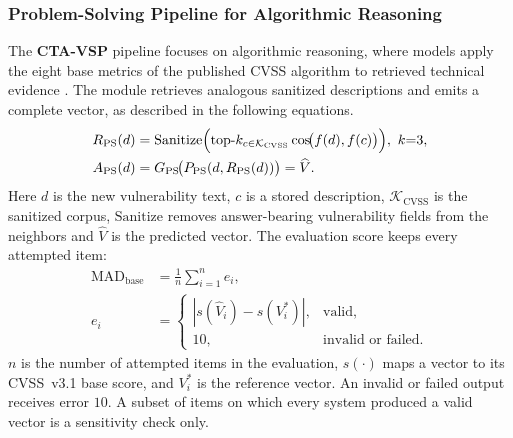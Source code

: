 \documentclass[5p,times,authoryear]{elsarticle}
\begin{document}
\subsubsection{Problem-Solving Pipeline for Algorithmic Reasoning}
The \textbf{CTA-VSP} pipeline focuses on algorithmic reasoning, where models apply the eight base metrics of the published CVSS algorithm to retrieved technical evidence \citep{first2024cvss}. The module retrieves analogous sanitized descriptions and emits a complete vector, as described in the following equations. 
\begin{align}
R_{\mathrm{PS}}(d)&=\mathrm{Sanitize}\Bigl(\mathrm{top}\text{-}k_{c\in\mathcal{K}_{\mathrm{CVSS}}}\cos\!\bigl(f(d),f(c)\bigr)\Bigr),\ k{=}3,\label{eq:rps}\\
A_{\mathrm{PS}}(d)&=G_{\mathrm{PS}}\!\bigl(P_{\mathrm{PS}}(d,R_{\mathrm{PS}}(d))\bigr)=\widehat{V}.\label{eq:aps}
\end{align}
Here $d$ is the new vulnerability text, $c$ is a stored description, $\mathcal{K}_{\mathrm{CVSS}}$ is the sanitized corpus, $\mathrm{Sanitize}$ removes answer-bearing vulnerability fields from the neighbors and $\widehat{V}$ is the predicted vector. The evaluation score keeps every attempted item:
\begin{align}
\mathrm{MAD}_{\mathrm{base}}&=\frac{1}{n}\sum_{i=1}^{n}e_i,\label{eq:mad-base}\\
 e_i&=\begin{cases}|s(\widehat{V}_i)-s(V_i^\ast)|,&\text{valid},\\10,&\text{invalid or failed.}\end{cases}\nonumber
\end{align}
$n$ is the number of attempted items in the evaluation, $s(\cdot)$ maps a vector to its CVSS~v3.1 base score, and $V_i^\ast$ is the reference vector. An invalid or failed output receives error $10$. A subset of items on which every system produced a valid vector is a sensitivity check only.
\end{document}
